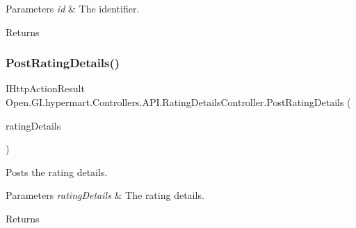 \begin{DoxyParams}{Parameters}
{\em id} & The identifier.\\
\hline
\end{DoxyParams}
\begin{DoxyReturn}{Returns}

\end{DoxyReturn}
\hypertarget{class_open_1_1_g_i_1_1hypermart_1_1_controllers_1_1_a_p_i_1_1_rating_details_controller_a8319f5f58c948de731eac334adcd2e82}{}\label{class_open_1_1_g_i_1_1hypermart_1_1_controllers_1_1_a_p_i_1_1_rating_details_controller_a8319f5f58c948de731eac334adcd2e82} 
\subsubsection{\texorpdfstring{Post\+Rating\+Details()}{PostRatingDetails()}}
{\footnotesize\ttfamily I\+Http\+Action\+Result Open.\+G\+I.\+hypermart.\+Controllers.\+A\+P\+I.\+Rating\+Details\+Controller.\+Post\+Rating\+Details (\begin{DoxyParamCaption}\item[{\hyperlink{class_open_1_1_g_i_1_1hypermart_1_1_models_1_1_rating_details}{Rating\+Details}}]{rating\+Details }\end{DoxyParamCaption})}



Posts the rating details. 


\begin{DoxyParams}{Parameters}
{\em rating\+Details} & The rating details.\\
\hline
\end{DoxyParams}
\begin{DoxyReturn}{Returns}

\end{DoxyReturn}
\hypertarget{class_open_1_1_g_i_1_1hypermart_1_1_controllers_1_1_a_p_i_1_1_rating_details_controller_aeaa95bcc98646b2a84205b111b0d2560}{}\label{class_open_1_1_g_i_1_1hypermart_1_1_controllers_1_1_a_p_i_1_1_rating_details_controller_aeaa95bcc98646b2a84205b111b0d2560} 
